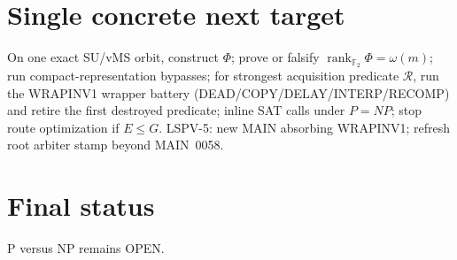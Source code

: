 \documentclass[11pt]{article}
\begin{document}
\section*{Single concrete next target}
On one exact SU/vMS orbit, construct $\Phi$; prove or falsify
$\boxed{\operatorname{rank}_{\mathbb F_2}\Phi=\omega(m)}$;
run compact-representation bypasses; for strongest acquisition predicate $\mathcal R$,
run the WRAPINV1 wrapper battery (DEAD/COPY/DELAY/INTERP/RECOMP) and retire the first
destroyed predicate; inline SAT calls under $P=NP$; stop route optimization if $E\le G$.
LSPV-5: new MAIN absorbing WRAPINV1; refresh root arbiter stamp beyond MAIN~0058.

\section*{Final status}
P versus NP remains OPEN.

\end{document}
